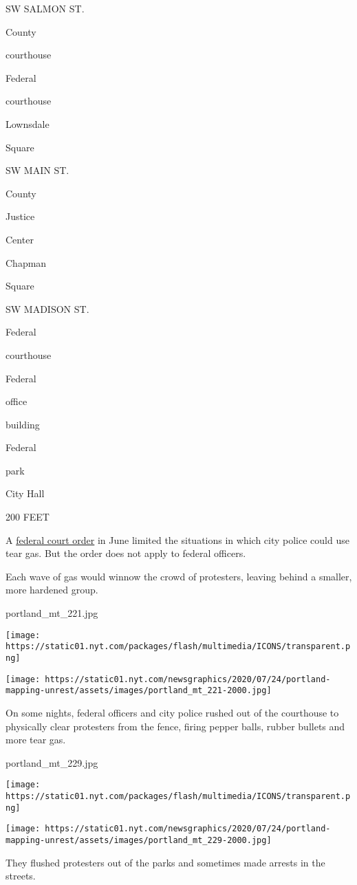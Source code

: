 SW SALMON ST.

County

courthouse

Federal

courthouse

Lownsdale

Square

SW MAIN ST.

County

Justice

Center

Chapman

Square

SW MADISON ST.

Federal

courthouse

Federal

office

building

Federal

park

City Hall

200 FEET

A
\href{https://drive.google.com/file/d/1ffmJ7_h_nGEERZUaUe2LhjALyCEbrNBQ/view}{federal
court order} in June limited the situations in which city police could
use tear gas. But the order does not apply to federal officers.

Each wave of gas would winnow the crowd of protesters, leaving behind a
smaller, more hardened group.

portland\_mt\_221.jpg

\texttt{[image: https://static01.nyt.com/packages/flash/multimedia/ICONS/transparent.png]}

\texttt{[image: https://static01.nyt.com/newsgraphics/2020/07/24/portland-mapping-unrest/assets/images/portland\_mt\_221-2000.jpg]}

On some nights, federal officers and city police rushed out of the
courthouse to physically clear protesters from the fence, firing pepper
balls, rubber bullets and more tear gas.

portland\_mt\_229.jpg

\texttt{[image: https://static01.nyt.com/packages/flash/multimedia/ICONS/transparent.png]}

\texttt{[image: https://static01.nyt.com/newsgraphics/2020/07/24/portland-mapping-unrest/assets/images/portland\_mt\_229-2000.jpg]}

They flushed protesters out of the parks and sometimes made arrests in
the streets.


